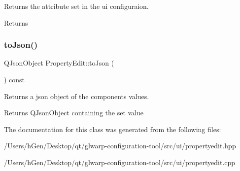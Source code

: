Returns the attribute set in the ui configuraion. 

\begin{DoxyReturn}{Returns}

\end{DoxyReturn}
\mbox{\label{class_property_edit_a94cdfb72670c88ca66a29b4a62632c8a}} 
\subsubsection{\texorpdfstring{to\+Json()}{toJson()}}
{\footnotesize\ttfamily Q\+Json\+Object Property\+Edit\+::to\+Json (\begin{DoxyParamCaption}{ }\end{DoxyParamCaption}) const}



Returns a json object of the components values. 

\begin{DoxyReturn}{Returns}
Q\+Json\+Object containing the set value 
\end{DoxyReturn}


The documentation for this class was generated from the following files\+:\begin{DoxyCompactItemize}
\item 
/\+Users/h\+Gen/\+Desktop/qt/glwarp-\/configuration-\/tool/src/ui/propertyedit.\+hpp\item 
/\+Users/h\+Gen/\+Desktop/qt/glwarp-\/configuration-\/tool/src/ui/propertyedit.\+cpp\end{DoxyCompactItemize}
